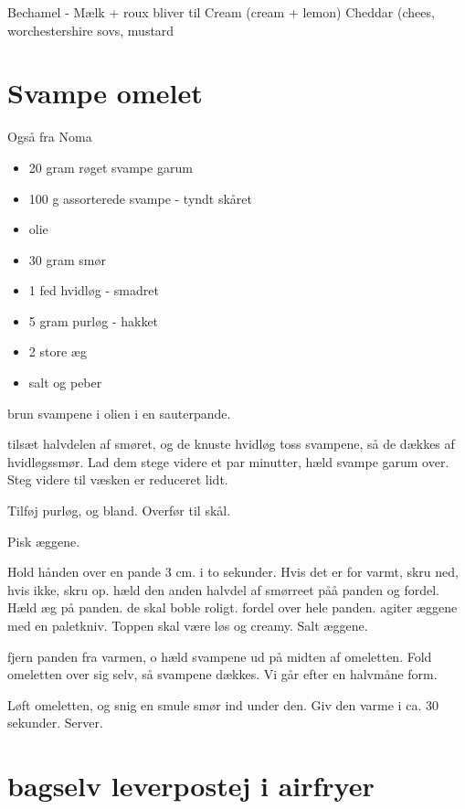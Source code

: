 \documentclass[
]{book}
\providecommand{\tightlist}{%
  \setlength{\itemsep}{0pt}\setlength{\parskip}{0pt}}
\begin{document}
Bechamel - Mælk + roux
bliver til
Cream (cream + lemon)
Cheddar (chees, worchestershire sovs, mustard

\hypertarget{svampe-omelet}{%
\section{Svampe omelet}\label{svampe-omelet}}

Også fra Noma

\begin{itemize}
\tightlist
\item
  20 gram røget svampe garum
\item
  100 g assorterede svampe - tyndt skåret
\item
  olie
\item
  30 gram smør
\item
  1 fed hvidløg - smadret
\item
  5 gram purløg - hakket
\item
  2 store æg
\item
  salt og peber
\end{itemize}

brun svampene i olien i en sauterpande.

tilsæt halvdelen af smøret, og de knuste hvidløg
toss svampene, så de dækkes af hvidløgssmør.
Lad dem stege videre et par minutter, hæld svampe garum over. Steg videre til væsken er reduceret lidt.

Tilføj purløg, og bland. Overfør til skål.

Pisk æggene.

Hold hånden over en pande 3 cm. i to sekunder. Hvis det er for varmt, skru ned, hvis ikke, skru op.
hæld den anden halvdel af smørreet påå panden og fordel.
Hæld æg på panden. de skal boble roligt. fordel over hele panden. agiter æggene med en paletkniv.
Toppen skal være løs og creamy. Salt æggene.

fjern panden fra varmen, o hæld svampene ud på midten af omeletten.
Fold omeletten over sig selv, så svampene dækkes. Vi går efter en halvmåne form.

Løft omeletten, og snig en smule smør ind under den. Giv den varme i ca. 30 sekunder. Server.

\hypertarget{bagselv-leverpostej-i-airfryer}{%
\section{bagselv leverpostej i airfryer}\label{bagselv-leverpostej-i-airfryer}}
\end{document}
